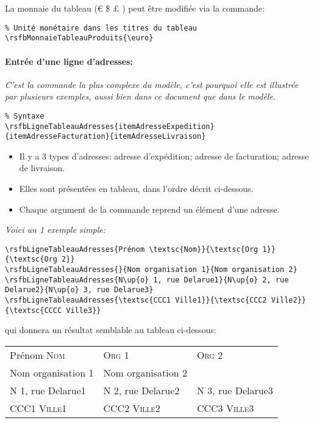 \documentclass[a4paper,10pt]{article}
\begin{document}
La monnaie du tableau (\euro{} \${} \pounds{} \textyen{}) peut être modifiée via la commande:
\begin{lstlisting}
% Unité monétaire dans les titres du tableau
\rsfbMonnaieTableauProduits{\euro}
\end{lstlisting}

\paragraph{Entrée d'une ligne d'adresses:} \emph{C'est la commande la plus complexe du modèle, c'est pourquoi elle est illustrée par plusieurs exemples, aussi bien dans ce document que dans le modèle.}

\begin{lstlisting}
% Syntaxe
\rsfbLigneTableauAdresses{itemAdresseExpedition}{itemAdresseFacturation}{itemAdresseLivraison}
\end{lstlisting}

\begin{itemize}
    \item Il y a 3 types d'adresses: adresse d'expédition;  adresse de facturation;  adresse de livraison.
    \item Elles sont présentées en tableau, dans l'ordre décrit ci-dessous.
    \item Chaque argument de la commande reprend un élément d'une adresse.
\end{itemize}

\emph{Voici un 1 exemple simple:}
\begin{lstlisting}
\rsfbLigneTableauAdresses{Prénom \textsc{Nom}}{\textsc{Org 1}}{\textsc{Org 2}}
\rsfbLigneTableauAdresses{}{Nom organisation 1}{Nom organisation 2}
\rsfbLigneTableauAdresses{N\up{o} 1, rue Delarue1}{N\up{o} 2, rue Delarue2}{N\up{o} 3, rue Delarue3}
\rsfbLigneTableauAdresses{\textsc{CCC1 Ville1}}{\textsc{CCC2 Ville2}}{\textsc{CCCC Ville3}}
\end{lstlisting}

qui donnera un résultat semblable au tableau ci-dessous:
\begin{flushleft}
\begin{tabular}{p{}p{}p{}}
\hline
 Prénom \textsc{Nom} & \textsc{Org 1} & \textsc{Org 2}\\
 Nom organisation 1 & Nom organisation 2 &  \\
 N\up{o} 1, rue Delarue1 & N\up{o} 2, rue Delarue2 & N\up{o} 3, rue Delarue3\\
 \textsc{CCC1 Ville1} & \textsc{CCC2 Ville2} & \textsc{CCC3 Ville3}\\
\hline
\end{tabular}
\end{flushleft}
\end{document}
